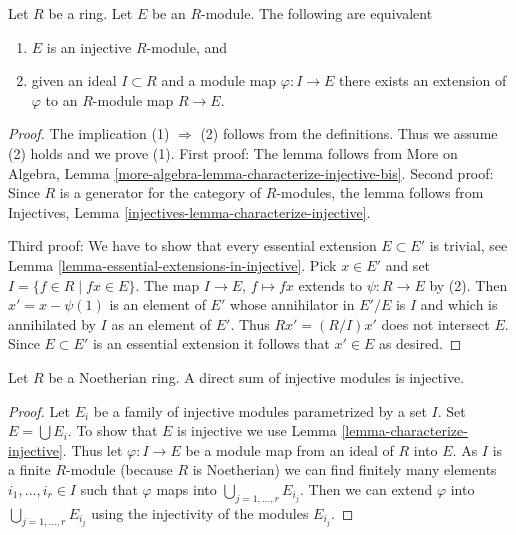 \begin{lemma}
\label{lemma-characterize-injective}
Let $R$ be a ring. Let $E$ be an $R$-module. The following are equivalent
\begin{enumerate}
\item $E$ is an injective $R$-module, and
\item given an ideal $I \subset R$ and a module map $\varphi : I \to E$
there exists an extension of $\varphi$ to an $R$-module map $R \to E$.
\end{enumerate}
\end{lemma}

\begin{proof}
The implication (1) $\Rightarrow$ (2) follows from the definitions.
Thus we assume (2) holds and we prove (1).
First proof: The lemma follows from
More on Algebra, Lemma \ref{more-algebra-lemma-characterize-injective-bis}.
Second proof: Since $R$ is a generator for the category of $R$-modules,
the lemma follows from
Injectives, Lemma \ref{injectives-lemma-characterize-injective}.

\medskip\noindent
Third proof: We have to show that every essential extension $E \subset E'$
is trivial, see Lemma \ref{lemma-essential-extensions-in-injective}.
Pick $x \in E'$ and set $I = \{f \in R \mid fx \in E\}$.
The map $I \to E$, $f \mapsto fx$ extends to $\psi : R \to E$ by (2).
Then $x' = x - \psi(1)$ is an element of $E'$ whose annihilator in
$E'/E$ is $I$ and which is annihilated by $I$ as an element of $E'$.
Thus $Rx' = (R/I)x'$ does not intersect $E$. Since $E \subset E'$
is an essential extension it follows that $x' \in E$ as desired.
\end{proof}

\begin{lemma}
\label{lemma-sum-injective-modules}
Let $R$ be a Noetherian ring. A direct sum of injective modules
is injective.
\end{lemma}

\begin{proof}
Let $E_i$ be a family of injective modules parametrized by a set $I$.
Set $E = \bigcup E_i$. To show that $E$ is injective we use
Lemma \ref{lemma-characterize-injective}.
Thus let $\varphi : I \to E$ be a module map from an ideal of $R$
into $E$. As $I$ is a finite $R$-module (because $R$ is Noetherian)
we can find finitely many elements $i_1, \ldots, i_r \in I$
such that $\varphi$ maps into $\bigcup_{j = 1, \ldots, r} E_{i_j}$.
Then we can extend $\varphi$ into $\bigcup_{j = 1, \ldots, r} E_{i_j}$
using the injectivity of the modules $E_{i_j}$.
\end{proof}

